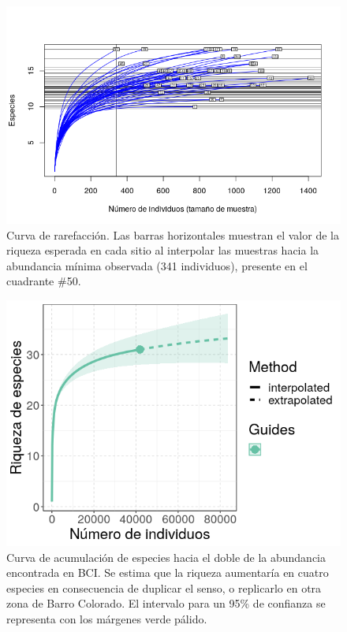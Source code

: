\documentclass[11pt,]{article}
\begin{document}
\begin{figure}
\centering
\includegraphics{rarefaccion_min_abun.png}
\caption{Curva de rarefacción. Las barras horizontales muestran el valor
de la riqueza esperada en cada sitio al interpolar las muestras hacia la
abundancia mínima observada (341 individuos), presente en el cuadrante
\#50. \label{fig:rarefaccion_min_abun}}
\end{figure}

\begin{figure}
\centering
\includegraphics{curva_extrapol_doble_esfuerzo.png}
\caption{Curva de acumulación de especies hacia el doble de la
abundancia encontrada en BCI. Se estima que la riqueza aumentaría en
cuatro especies en consecuencia de duplicar el senso, o replicarlo en
otra zona de Barro Colorado. El intervalo para un 95\% de confianza se
representa con los márgenes verde pálido.
\label{fig:curva_extrapol_doble_esfuerzo}}
\end{figure}
\end{document}
